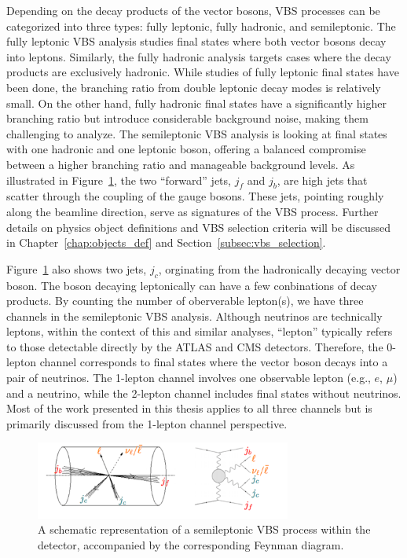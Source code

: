 Depending on the decay products of the vector bosons, VBS processes can be categorized into three types: fully leptonic, fully hadronic, and semileptonic. 
The fully leptonic VBS analysis studies final states where both vector bosons decay into leptons. 
Similarly, the fully hadronic analysis targets cases where the decay products are exclusively hadronic.
While studies of fully leptonic final states have been done, the branching ratio from double leptonic decay modes is relatively small. On the other hand, fully hadronic final states have a significantly higher branching ratio but introduce considerable background noise, making them challenging to analyze.
The semileptonic VBS analysis is looking at final states with one hadronic and one leptonic boson, offering a balanced compromise between a higher branching ratio and manageable background levels. As illustrated in Figure~\ref{fig:semi_vbs}, the two ``forward'' jets, $j_{f}$ and $j_{b}$, are high \pt jets that scatter through the coupling of the gauge bosons. These jets, pointing roughly along the beamline direction, serve as signatures of the VBS process. Further details on physics object definitions and VBS selection criteria will be discussed in Chapter~\ref{chap:objects_def} and Section~\ref{subsec:vbs_selection}.

Figure~\ref{fig:semi_vbs} also shows two jets, $j_{c}$, orginating from the hadronically decaying vector boson. 
The boson decaying leptonically can have a few conbinations of decay products. 
By counting the number of oberverable lepton(s), we have three channels in the semileptonic VBS analysis. 
Although neutrinos are technically leptons, within the context of this and similar analyses, ``lepton'' typically refers to those detectable directly by the ATLAS and CMS detectors.
Therefore, the 0-lepton channel corresponds to final states where the vector boson decays into a pair of neutrinos.
The 1-lepton channel involves one observable lepton (e.g., $e$, $\mu$) and a neutrino, while the 2-lepton channel includes final states without neutrinos. Most of the work presented in this thesis applies to all three channels but is primarily discussed from the 1-lepton channel perspective.

\begin{figure}[tbp]
\centering
\includegraphics[width=0.75\textwidth]{figures/theory/semi_vbs.png}
\caption{
A schematic representation of a semileptonic VBS process within the detector, accompanied by the corresponding Feynman diagram.
}
\label{fig:semi_vbs}
\end{figure}


